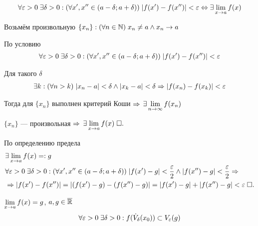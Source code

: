 \documentclass{article}
\begin{document}

\begin{align*}
	\forall\varepsilon>0\;\exists\delta>0:(\forall x',x''\in (a-\delta;a+\delta))\;|f(x')-f(x'')|<\varepsilon\Leftrightarrow\exists\lim\limits_{x\to a}f(x)
\end{align*}

\onlyif

Возьмём произвольную $\{x_{n}\}:(\forall n\in\mathbb{N})\;x_{n}\neq a\land x_{n}\to a$

По условию
\begin{align*}
	\forall\varepsilon>0\;\exists\delta>0:(\forall x',x''\in (a-\delta;a+\delta))\;|f(x')-f(x'')|<\varepsilon
\end{align*}

Для такого $\delta$
\begin{align*}
	\exists k:(\forall n>k)\;|x_{n}-a|<\delta\land |x_{k}-a|<\delta\Rightarrow |f(x_{n})-f(x_{k})|<\varepsilon
\end{align*}

Тогда для $\{x_{n}\}$ выполнен критерий Коши $\Rightarrow$ $\exists\lim\limits_{n\to\infty} f(x_{n})$

$\{x_{n}\}$ --- произвольная $\Rightarrow$ $\exists\lim\limits_{x\to a}f(x)\;\square.$

\enough

По определению предела
\begin{align*}
	 & \exists\lim\limits_{x\to a}f(x)=:g                                                                                                          \\
	 & \forall\varepsilon>0\;\exists\delta>0:(\forall x',x''\in (a-\delta;a+\delta))\;|f(x')-g|<\frac{\varepsilon}{2}\land |f(x'')-g|<\frac{\varepsilon}{2}\Rightarrow \\
	 & \Rightarrow |f(x')-f(x'')|=|(f(x')-g)-(f(x'')-g)|=|f(x')-g|+|f(x'')-g|<\varepsilon\;\square.
\end{align*}


$\lim\limits_{x\to a}f(x)=g$, $a,g\in\overline{\mathbb{R}}$
\begin{align*}
	\forall\varepsilon>0\;\exists\delta>0:f(\dot{V}_{\delta}(x_0))\subset V_{\varepsilon}(g)
\end{align*}
\end{document}
